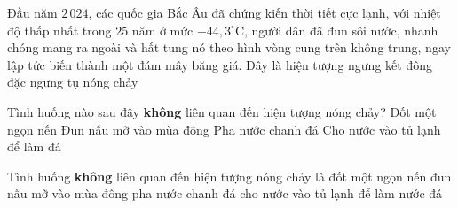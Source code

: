 \begin{ex}
	{\color{red}\footnotesize\ttfamily [L12C1B1-TN-8]}\par %
	Đầu năm $2\,024$, các quốc gia Bắc Âu đã chứng kiến thời tiết cực lạnh, với nhiệt độ thấp nhất trong $25$ năm ở mức $-44{,}3^\circ \mathrm{C}$, người dân đã đun sôi nước, nhanh chóng mang ra ngoài và hất tung nó theo hình vòng cung trên không trung, ngay lập tức biến thành một đám mây băng giá. Đây là hiện tượng
	\choice
	{ngưng kết}
	{\True đông đặc}
	{ngưng tụ}
	{nóng chảy}
\end{ex}

\begin{ex}
	{\color{red}\footnotesize\ttfamily [L12C1B1-TN-11]}\par %
	Tình huống nào sau đây \textbf{không}  liên quan đến hiện tượng nóng chảy?
	\choice
	{Đốt một ngọn nến}
	{Đun nấu mỡ vào mùa đông}
	{Pha nước chanh đá}
	{\True Cho nước vào tủ lạnh để làm đá}
\end{ex}

\begin{ex}
	{\color{red}\footnotesize\ttfamily [L12C1B1-TN-13]}\par %
	Tình huống \textbf{không} liên quan đến hiện tượng nóng chảy là
	\choice
	{đốt một ngọn nến}
	{đun nấu mỡ vào mùa đông}
	{pha nước chanh đá}
	{\True cho nước vào tủ lạnh để làm nước đá}
\end{ex}

